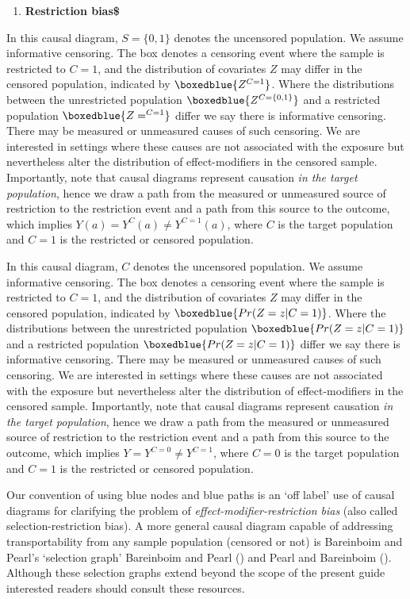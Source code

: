 \documentclass[
  singlecolumn]{article}
\providecommand{\tightlist}{%
  \setlength{\itemsep}{0pt}\setlength{\parskip}{0pt}}\usepackage{longtable,booktabs,array}
\begin{document}
\begin{enumerate}
\def\labelenumi{\arabic{enumi}.}
\setcounter{enumi}{2}
\tightlist
\item
  \textbf{Restriction bias\$}
\end{enumerate}

In this causal diagram, \(S=\{0,1\}\) denotes the uncensored population.
We assume informative censoring. The box denotes a censoring event where
the sample is restricted to \(C=1\), and the distribution of covariates
\(Z\) may differ in the censored population, indicated by
\(\boxedblue{Z^{C=1}}\). Where the distributions between the
unrestricted population \(\boxedblue{Z^{C=\{0,1\}}}\) and a restricted
population \(\boxedblue{Z=^{C=1}}\) differ we say there is informative
censoring. There may be measured or unmeasured causes of such censoring.
We are interested in settings where these causes are not associated with
the exposure but nevertheless alter the distribution of effect-modifiers
in the censored sample. Importantly, note that causal diagrams represent
causation \emph{in the target population}, hence we draw a path from the
measured or unmeasured source of restriction to the restriction event
and a path from this source to the outcome, which implies
\(Y(a) =Y^{C}(a)\ne Y^{C=1}(a)\), where \(C\) is the target population
and \(C=1\) is the restricted or censored population.

In this causal diagram, \(C\) denotes the uncensored population. We
assume informative censoring. The box denotes a censoring event where
the sample is restricted to \(C=1\), and the distribution of covariates
\(Z\) may differ in the censored population, indicated by
\(\boxedblue{Pr(Z=z|C=1)}\). Where the distributions between the
unrestricted population \(\boxedblue{Pr(Z=z|C=1)}\) and a restricted
population \(\boxedblue{Pr(Z=z|C=1)}\) differ we say there is
informative censoring. There may be measured or unmeasured causes of
such censoring. We are interested in settings where these causes are not
associated with the exposure but nevertheless alter the distribution of
effect-modifiers in the censored sample. Importantly, note that causal
diagrams represent causation \emph{in the target population}, hence we
draw a path from the measured or unmeasured source of restriction to the
restriction event and a path from this source to the outcome, which
implies \(Y =Y^{C=0}\ne Y^{C=1}\), where \(C=0\) is the target
population and \(C=1\) is the restricted or censored population.

Our convention of using blue nodes and blue paths is an `off label' use
of causal diagrams for clarifying the problem of
\emph{effect-modifier-restriction bias} (also called
selection-restriction bias). A more general causal diagram capable of
addressing transportability from any sample population (censored or not)
is Bareinboim and Pearl's `selection graph' Bareinboim and Pearl
() and Pearl and Bareinboim
(). Although these selection graphs extend
beyond the scope of the present guide interested readers should consult
these resources.
\end{document}
